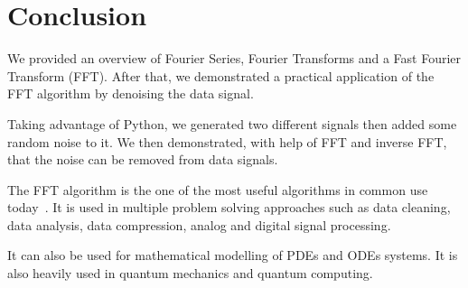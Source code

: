 \documentclass[a4paper, 12pt]{scrartcl}
\begin{document}
\section{Conclusion}
We provided an overview of Fourier Series, Fourier Transforms and a Fast Fourier Transform (FFT). 
After that, we demonstrated a practical application of the FFT algorithm by denoising the data signal.

Taking advantage of Python, we generated two different signals then added some random noise to it.
We then demonstrated, with help of FFT and inverse FFT, that the noise can be removed from data signals.

The FFT algorithm is the one of the most useful algorithms in common use today~\cite{fftalg}. 
It is used in multiple problem solving approaches such as data cleaning, data analysis, data compression, analog and digital signal processing.

It can also be used for mathematical modelling of PDEs and ODEs systems.
It is also heavily used in quantum mechanics and quantum computing.

\newpage


  
\end{document}

